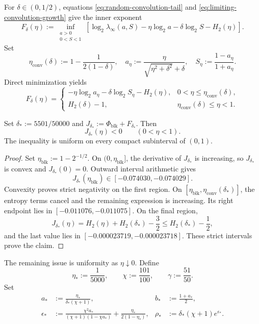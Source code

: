 For $\delta\in(0,1/2)$, equations
\eqref{eq:random-convolution-tail} and
\eqref{eq:limiting-convolution-growth} give the inner exponent
\begin{equation}
  F_\delta(\eta)
  :=
  \inf_{\substack{a>0\\0<S<1}}
  \left[
    \log_2\lambda_\infty(a,S)
    -\eta\log_2a
    -\delta\log_2S
    -H_2(\eta)
  \right].
  \label{eq:random-inner-linear-exponent}
\end{equation}
Set
\[
  \eta_{\mathrm{conv}}(\delta)
  :=1-\frac1{2(1-\delta)},
  \quad
  a_\eta
  :=\frac{\eta}{\sqrt{\eta^2+\delta^2}+\delta},
  \quad
  S_\eta:=\frac{1-a_\eta}{1+a_\eta}.
\]
Direct minimization yields
\begin{equation}
  F_\delta(\eta)
  =
  \begin{cases}
    -\eta\log_2a_\eta-\delta\log_2S_\eta-H_2(\eta),
      &0<\eta\le\eta_{\mathrm{conv}}(\delta),\\[1mm]
    H_2(\delta)-1,
      &\eta_{\mathrm{conv}}(\delta)\le\eta<1.
  \end{cases}
  \label{eq:closed-random-inner-exponent}
\end{equation}

\begin{lemma}
\label{lem:random-spin-linear-closure}
Set $\delta_*:=5501/50000$ and
$J_{\delta_*}:=\Phi_{\mathrm{blk}}+F_{\delta_*}$. Then
\[
  J_{\delta_*}(\eta)<0
  \qquad(0<\eta<1).
\]
The inequality is uniform on every compact subinterval of $(0,1)$.
\end{lemma}

\begin{proof}
Set $\eta_{\mathrm{blk}}:=1-2^{-1/2}$. On
$(0,\eta_{\mathrm{blk}}]$, the derivative of $J_{\delta_*}$ is increasing,
so $J_{\delta_*}$ is convex and $J_{\delta_*}(0)=0$. Outward interval
arithmetic gives
\[
  J_{\delta_*}(\eta_{\mathrm{blk}})
  \in[-0.074030,-0.074029].
\]
Convexity proves strict negativity on the first region. On
$[\eta_{\mathrm{blk}},\eta_{\mathrm{conv}}(\delta_*)]$, the entropy terms
cancel and the remaining expression is increasing. Its right endpoint lies
in $[-0.011076,-0.011075]$. On the final region,
\[
  J_{\delta_*}(\eta)
  =H_2(\eta)+H_2(\delta_*)-\frac32
  \le H_2(\delta_*)-\frac12,
\]
and the last value lies in
$[-0.000023719,-0.000023718]$. These strict intervals prove the claim.
\end{proof}

The remaining issue is uniformity as $\eta\downarrow0$. Define
\[
  \eta_*:=\frac1{5000},
  \qquad
  \chi:=\frac{101}{100},
  \qquad
  \gamma:=\frac{51}{50}.
\]
Set
\begin{align*}
  a_*&:=\frac{\eta_*}{\delta_*(\chi+1)},
  &b_*&:=\frac{1+a_*}{2},\\
  \epsilon_*&:=
  \frac{\chi^2a_*}{(\chi+1)(1-\chi a_*)}
  +\frac{\eta_*}{2(1-\eta_*)},
  &\rho_*&:=\delta_*(\chi+1)e^{\epsilon_*}.
\end{align*}

